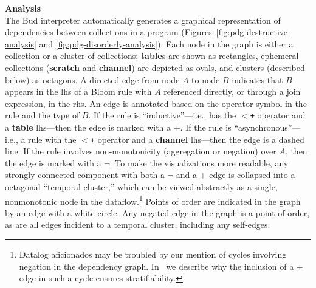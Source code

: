 
\noindent
\textbf{Analysis}\\
\noindent
The Bud interpreter automatically generates a graphical
representation of dependencies between collections in a program
(Figures~\ref{fig:pdg-destructive-analysis} and \ref{fig:pdg-disorderly-analysis}).
Each node in the graph is either a collection or a cluster of collections; \textbf{table}s are shown as rectangles, ephemeral
collections (\textbf{scratch} and \textbf{channel}) are depicted as ovals, and clusters (described below) as octagons.  A
directed edge from node $A$ to node $B$ indicates that $B$ appears in the
lhs of a Bloom rule with $A$ referenced directly, or through a join expression,
in the rhs.  An edge is annotated based on the operator symbol in the rule and
the type of $B$.  If the rule is ``inductive''---i.e., has the \texttt{$<$+}
operator and a {\bf table} lhs---then the edge is marked with a $+$.  If the
rule is ``asynchronous''---i.e., a rule with the \texttt{$<$+} operator and a {\bf
channel} lhs---then the edge is a dashed line.  If the rule involves
non-monotonicity (aggregation or negation) over $A$, then the edge is marked with a $\lnot$.
To make the visualizations more readable, any strongly connected component with both a $\lnot$ and a $+$ edge is collapsed into a octagonal ``temporal cluster,'' 
which can be viewed abstractly as a single, nonmonotonic node in the 
dataflow.\footnote{Datalog aficionados may be troubled by our mention of cycles
involving negation in the dependency graph.  In~\cite{dedalus-techr} we
describe why the inclusion of a $+$ edge in such a cycle ensures stratifiability.}
Points of order are indicated in the graph by an edge with a white circle.
 Any negated edge in the graph is a point of order, as are all edges incident to a temporal cluster, including any self-edges.


